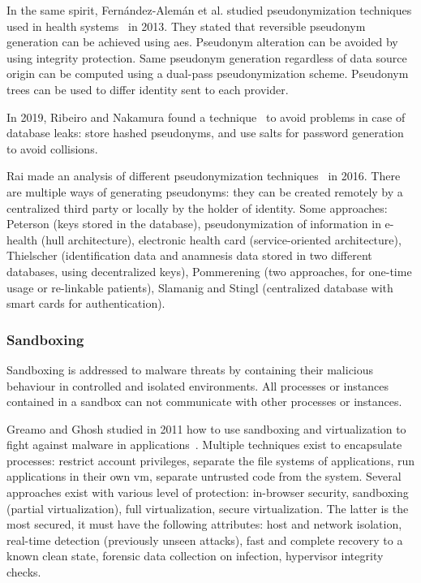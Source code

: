 In the same spirit, Fernández-Alemán et al. studied pseudonymization techniques used in health systems~\cite{fernandez-aleman_security_2013} in 2013. They stated that reversible pseudonym generation can be achieved using \gls{aes}. Pseudonym alteration can be avoided by using integrity protection. Same pseudonym generation regardless of data source origin can be computed using a dual-pass pseudonymization scheme. Pseudonym trees can be used to differ identity sent to each provider. %

In 2019, Ribeiro and Nakamura found a technique~\cite{ribeiro_privacy_2019} to avoid problems in case of database leaks: store hashed pseudonyms, and use salts for password generation to avoid collisions. %

Rai made an analysis of different pseudonymization techniques~\cite{rai_pseudonymization_2016} in 2016. There are multiple ways of generating pseudonyms: they can be created remotely by a centralized third party or locally by the holder of identity. Some approaches: Peterson (keys stored in the database), pseudonymization of information in e-health (hull architecture), electronic health card (service-oriented architecture), Thielscher (identification data and anamnesis data stored in two different databases, using decentralized keys), Pommerening (two approaches, for one-time usage or re-linkable patients), Slamanig and Stingl (centralized database with smart cards for authentication). %

\subsubsection{Sandboxing}
\label{subsubsec:state_review_results_sandboxing}

Sandboxing is addressed to malware threats by containing their malicious behaviour in controlled and isolated environments. All processes or instances contained in a sandbox can not communicate with other processes or instances.

Greamo and Ghosh studied in 2011 how to use sandboxing and virtualization to fight against malware in applications~\cite{greamo_sandboxing_2011}. Multiple techniques exist to encapsulate processes: restrict account privileges, separate the file systems of applications, run applications in their own \gls{vm}, separate untrusted code from the system. Several approaches exist with various level of protection: in-browser security, sandboxing (partial virtualization), full virtualization, secure virtualization. The latter is the most secured, it must have the following attributes: host and network isolation, real-time detection (previously unseen attacks), fast and complete recovery to a known clean state, forensic data collection on infection, hypervisor integrity checks. %

